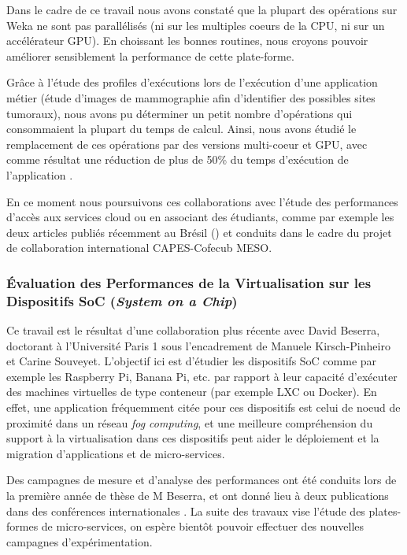 Dans le cadre de ce travail nous avons constaté que la plupart des opérations sur Weka ne sont pas parallélisés (ni sur les multiples c{oe}urs de la CPU, ni sur un accélérateur GPU). En choissant les bonnes routines, nous croyons pouvoir améliorer sensiblement la performance de cette plate-forme.

Grâce à l'étude des profiles d'exécutions lors de l'exécution d'une application métier (étude d'images de mammographie afin d'identifier des possibles sites tumoraux), nous avons pu déterminer un petit nombre d'opérations qui consommaient la plupart du temps de calcul. Ainsi, nous avons étudié le remplacement de ces opérations par des versions multi-c{oe}ur et GPU, avec comme résultat une réduction de plus de 50\% du temps d'exécution de l'application \cite{Engel14a,Engel2015}.

En ce moment nous poursuivons ces collaborations avec l'étude des performances d'accès aux services cloud \cite{Charao17a}  ou en associant des étudiants, comme par exemple les deux articles publiés récemment au Brésil (\cite{Nesi17a, Muenchen17a}) et conduits dans le cadre du projet de collaboration international CAPES-Cofecub MESO.

\subsubsection*{Évaluation des Performances de la Virtualisation sur les Dispositifs SoC (\textit{System on a Chip})}

Ce travail est le résultat d'une collaboration plus récente avec David Beserra, doctorant à l'Université Paris 1 sous l'encadrement de Manuele Kirsch-Pinheiro et Carine Souveyet. L'objectif ici est d'étudier les dispositifs SoC comme par exemple les Raspberry Pi, Banana Pi, etc. par rapport à leur capacité d'exécuter des machines virtuelles de type conteneur (par exemple LXC ou Docker). En effet, une application fréquemment citée pour ces dispositifs est celui de n{oe}ud de proximité dans un réseau \textit{fog computing}, et une meilleure compréhension du support à la virtualisation dans ces dispositifs peut aider le déploiement et la migration d'applications et de micro-services.

Des campagnes de mesure et d'analyse des performances ont été conduits lors de la première année de thèse de M Beserra, et ont donné lieu à deux publications dans des conférences internationales \cite{Beserra17a, Beserra17b}. La suite des travaux vise l'étude des plates-formes de micro-services, on espère bientôt pouvoir effectuer des nouvelles campagnes d'expérimentation.